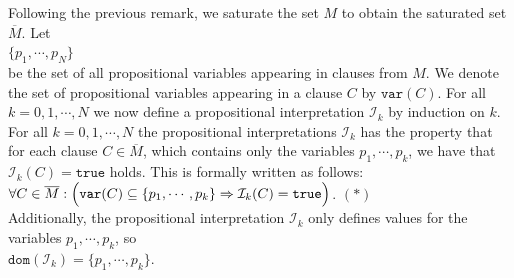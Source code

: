 Following the previous remark, we saturate the set $M$ to obtain the saturated set $\overline{M}$. Let
\\[0.2cm]
\hspace*{1.3cm}
$\{ p_1, \cdots, p_N \}$
\\[0.2cm]
be the set of all propositional variables appearing in clauses from $M$. We denote the set of propositional variables appearing in a clause $C$ by $\mathtt{var}(C)$.
For all $k=0,1,\cdots,N$
we now define a propositional interpretation $\mathcal{I}_k$ by induction on $k$.  For all $k=0,1,\cdots,N$ the
propositional interpretations $\mathcal{I}_k$ has the property that for each clause $C \in \overline{M}$,
which contains only the variables $p_1,\cdots,p_k$, we have that
$\mathcal{I}_k(C) = \mathtt{true}$ holds. This is formally written as follows:
\\[0.2cm]
\hspace*{1.3cm}
$\forall C \in \overline{M}:\Bigl(\mathtt{var}(C) \subseteq \{p_1, \cdots, p_k\} \Rightarrow \mathcal{I}_k(C) =
\mathtt{true}\Bigl)$. \hspace*{\fill} $(*)$
\\[0.2cm]
Additionally, the propositional interpretation $\mathcal{I}_k$ only defines values for the variables
$p_1,\cdots,p_k$, so
\\[0.2cm]
\hspace*{1.3cm}
$\mathtt{dom}(\mathcal{I}_k) = \{p_1, \cdots, p_k\}$.
